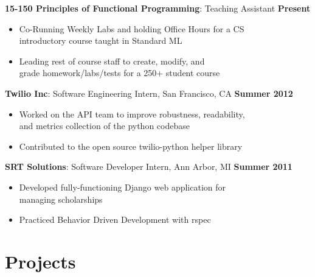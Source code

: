 \documentclass[sectioned]{dsyangres}
\begin{document}
\begin{resume}
\textbf{15-150 Principles of Functional
 Programming}: Teaching Assistant \hfill \textbf{Present}
 \begin{itemize} \itemsep -2pt
   \item Co-Running Weekly Labs and holding Office Hours for a CS\\
     introductory course taught in Standard ML
   \item Leading rest of course staff to create, modify, and\\
     grade homework/labs/tests for a 250+ student course
 \end{itemize}

\textbf{Twilio Inc}: Software Engineering Intern,
 San Francisco, CA \hfill \textbf{Summer 2012}
  \begin{itemize} \itemsep -2pt
    \item Worked on the API team to improve robustness, readability, \\
      and metrics collection of the python codebase
    \item Contributed to the open source twilio-python helper library
  \end{itemize}

\textbf{SRT Solutions}: Software Developer Intern,
  Ann Arbor, MI \hfill \textbf{Summer 2011}
  \begin{itemize} \itemsep -2pt
    \item Developed fully-functioning Django web application for\\
      managing scholarships
    \item Practiced Behavior Driven Development with rspec
  \end{itemize}



\section{Projects}


\end{resume}
\end{document}
